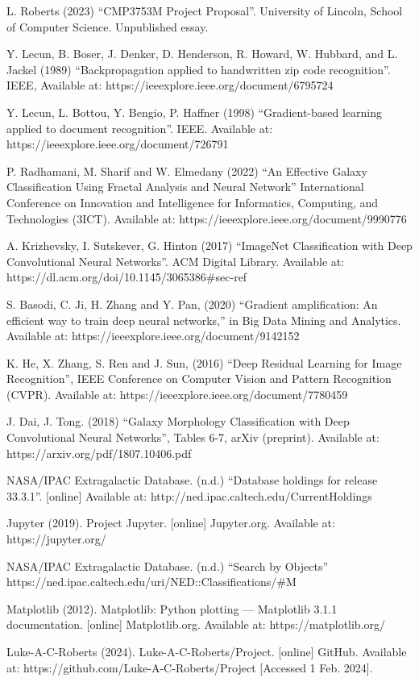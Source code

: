 \documentclass[12pt,runningheads]{llncs}
\begin{document}
\begin{thebibliography}{20}

\bibitem{}
L. Roberts (2023) “CMP3753M Project Proposal”. University of Lincoln, School of Computer Science. Unpublished essay.

\bibitem{}
Y. Lecun, B. Boser, J. Denker, D. Henderson, R. Howard, W. Hubbard, and L. Jackel (1989) “Backpropagation applied to handwritten zip code recognition”. IEEE, Available at: https://ieeexplore.ieee.org/document/6795724

\bibitem{}
Y. Lecun, L. Bottou, Y. Bengio, P. Haffner (1998) “Gradient-based learning applied to document recognition”. IEEE. Available at: https://ieeexplore.ieee.org/document/726791

\bibitem{}
P. Radhamani, M. Sharif and W. Elmedany (2022) “An Effective Galaxy Classification Using Fractal Analysis and Neural Network” International Conference on Innovation and Intelligence for Informatics, Computing, and Technologies (3ICT). Available at: https://ieeexplore.ieee.org/document/9990776

\bibitem{}
A. Krizhevsky, I. Sutskever, G. Hinton (2017) “ImageNet Classification with Deep
Convolutional Neural Networks”. ACM Digital Library. Available at: https://dl.acm.org/doi/10.1145/3065386\#sec-ref

\bibitem{}
S. Basodi, C. Ji, H. Zhang and Y. Pan, (2020) “Gradient amplification: An efficient way to train deep neural networks,” in Big Data Mining and Analytics. Available at: https://ieeexplore.ieee.org/document/9142152

\bibitem{}
K. He, X. Zhang, S. Ren and J. Sun, (2016) “Deep Residual Learning for Image Recognition”, IEEE Conference on Computer Vision and Pattern Recognition (CVPR). Available at: https://ieeexplore.ieee.org/document/7780459

\bibitem{}
J. Dai, J. Tong. (2018) “Galaxy Morphology Classification with Deep Convolutional Neural Networks”, Tables 6-7, arXiv (preprint). Available at: https://arxiv.org/pdf/1807.10406.pdf

\bibitem{}
NASA/IPAC Extragalactic Database. (n.d.) “Database holdings for release 33.3.1”. [online] Available at: http://ned.ipac.caltech.edu/CurrentHoldings

\bibitem{}
Jupyter (2019). Project Jupyter. [online] Jupyter.org. Available at: https://jupyter.org/

\bibitem{}
NASA/IPAC Extragalactic Database. (n.d.) “Search by Objects” https://ned.ipac.caltech.edu/uri/NED::Classifications/\#M

\bibitem{}
Matplotlib (2012). Matplotlib: Python plotting — Matplotlib 3.1.1 documentation. [online] Matplotlib.org. Available at: https://matplotlib.org/

\bibitem{}
Luke-A-C-Roberts (2024). Luke-A-C-Roberts/Project. [online] GitHub. Available at: https://github.com/Luke-A-C-Roberts/Project [Accessed 1 Feb. 2024].

\end{thebibliography}
\end{document}

